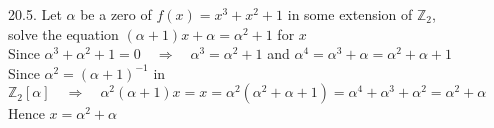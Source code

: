 \documentclass[12pt]{book}
\begin{document}
\begin{CJK}{UTF8}{bsmi}
20.5. Let $\alpha$ be a zero of $f(x)=x^3+x^2+1$ in some extension of $\mathbb{Z}_2$, \\
\hspace*{2em} solve the equation $(\alpha+1)x+\alpha=\alpha^2+1$ for $x$ \\
Since $\alpha^3+\alpha^2+1=0\quad\Rightarrow\quad\alpha^3=\alpha^2+1$ and $\alpha^4=\alpha^3+\alpha=\alpha^2+\alpha+1$ \\
Since $\alpha^2=(\alpha+1)^{-1}$ in $\mathbb{Z}_2[\alpha]\quad\Rightarrow\quad\alpha^2(\alpha+1)x=x=\alpha^2(\alpha^2+\alpha+1)=\alpha^4+\alpha^3+\alpha^2=\alpha^2+\alpha$ \\
Hence $x=\alpha^2+\alpha$

\end{CJK}
\end{document}

